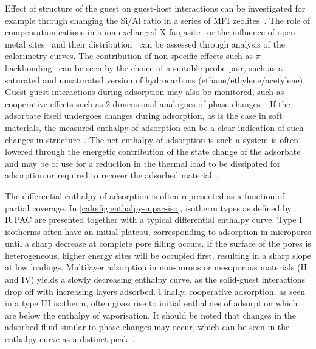 Effect of structure of the guest on guest-host interactions 
can be investigated for example through changing the Si/Al ratio
in a series of MFI zeolites~\cite{llewellynAdsorptionMFItypeZeolites1993}.
The role of compensation cations in a ion-exchanged 
X-faujasite~\cite{maurinAdsorptionArgonNitrogen2005} 
or the influence of open metal sites~\cite{grajciarUnderstandingCOAdsorption2011}
and their distribution~\cite{yoonControlledReducibilityMetalOrganic2010}
can be assessed through analysis of the calorimetry curves.
The contribution of non-specific effects such as \(\pi\)
backbonding~\cite{rubesAdsorptionPropanePropylene2013} can be 
seen by the choice of a suitable probe pair, such as a saturated
and unsaturated version of hydrocarbons (ethane/ethylene/acetylene).
Guest-guest interactions during adsorption may also be monitored,
such as cooperative effects such as 2-dimensional analogues of phase
changes~\cite{rouquerolCalorimetricEvidenceBidimensional1977}.
If the adsorbate itself undergoes changes during adsorption,
as is the case in soft materials, the measured enthalpy of 
adsorption can be a clear indication of such changes 
in structure~\cite{bourrellyDifferentAdsorptionBehaviors2005}.
The net enthalpy of adsorption is such a system is often
lowered through the energetic contribution of the state
change of the adsorbate and may be of use for a reduction in 
the thermal load to be dissipated for adsorption or required to 
recover the adsorbed material~\cite{masonMethaneStorageFlexible2015}.

The differential enthalpy of adsorption is often represented as a
function of partial coverage. In \autoref{calo:fig:enthalpy-iupac-iso},
isotherm types as defined by IUPAC are presented together with
a typical differential enthalpy curve. Type I isotherms often 
have an initial plateau, corresponding to adsorption in micropores
until a sharp decrease at complete pore filling occurs. If the surface
of the pores is heterogeneous, higher energy sites will be occupied
first, resulting in a sharp slope at low loadings. Multilayer
adsorption in non-porous or mesoporous materials (II and IV) yields
a slowly decreasing enthalpy curve, as the solid-guest interactions
drop off with increasing layers adsorbed. Finally, cooperative adsorption,
as seen in a type III isotherm, often gives rise to initial enthalpies
of adsorption which are below the enthalpy of vaporisation.
It should be noted that changes in the adsorbed fluid similar 
to phase changes may occur, which can be seen in the enthalpy curve
as a distinct peak~\cite{llewellynAdsorptionMFItypeZeolites1993, %
llewellynAdsorptionMFItypeZeolites1993a, %
rouquerolCalorimetricEvidenceBidimensional1977}.

